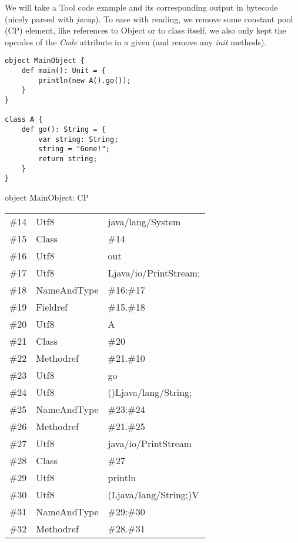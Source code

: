 %
%
%

We will take a Tool code example and its corresponding output in bytecode
(nicely parsed with \emph{javap}). To ease with reading, we remove some constant
pool (CP) element, like references to Object or to class itself, we also
only kept the opcodes of the \emph{Code} attribute in a given (and remove any
\emph{init} methods).

\newpage

\begin{lstlisting}
object MainObject {
	def main(): Unit = {
		println(new A().go());
	}
}

class A {
	def go(): String = {
		var string: String;
		string = "Gone!";
		return string;
	}
}
\end{lstlisting}

object MainObject: CP
\newline
\begin{tabular}{r l l} \hline
	\#14	& Utf8		& java/lang/System	\\
	\#15	& Class		& \#14			\\
	\#16	& Utf8		& out			\\
	\#17	& Utf8		& Ljava/io/PrintStream;	\\
	\#18	& NameAndType	& \#16:\#17		\\
	\#19	& Fieldref	& \#15.\#18		\\
	\#20	& Utf8		& A			\\
	\#21	& Class		& \#20			\\
	\#22	& Methodref	& \#21.\#10		\\
	\#23	& Utf8		& go			\\
	\#24	& Utf8		& ()Ljava/lang/String;	\\
	\#25	& NameAndType	& \#23:\#24		\\
	\#26	& Methodref	& \#21.\#25		\\
	\#27	& Utf8		& java/io/PrintStream	\\
	\#28	& Class		& \#27			\\
	\#29	& Utf8		& println		\\
	\#30	& Utf8		& (Ljava/lang/String;)V	\\
	\#31	& NameAndType	& \#29:\#30		\\
	\#32	& Methodref	& \#28.\#31		\\
\end{tabular}
\newline

